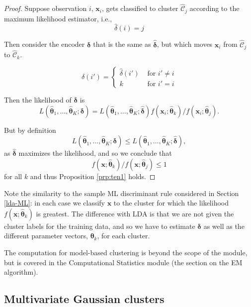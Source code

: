 \documentclass[
]{book}
\theoremstyle{definition}
\theoremstyle{definition}
\theoremstyle{definition}
\theoremstyle{definition}
\theoremstyle{remark}
\begin{document}
\begin{proof}
Suppose observation \(i\), \(\mathbf x_i\), gets classified to cluster \(\hat{\mathcal{C}}_j\) according to the maximum likelihood estimator, i.e.,
\[\hat{\delta}(i)=j\]

Then consider the encoder \(\boldsymbol \delta\) that is the same as \(\hat{\boldsymbol \delta}\), but which moves \(\mathbf x_i\) from \(\hat{\mathcal{C}}_j\) to \(\hat{\mathcal{C}}_k\).

\[\delta(i') =\begin{cases}
\hat{\delta}(i') &\mbox{ for } i' \not = i\\
 k & \mbox{ for } i' = i
\end{cases}\]

Then the likelihood of \(\boldsymbol \delta\) is
\[
L(\hat{\boldsymbol \theta}_1, \ldots , \hat{\boldsymbol \theta}_K; \boldsymbol \delta) = L(\hat{\boldsymbol \theta}_1, \ldots , \hat{\boldsymbol \theta}_K; \hat{\boldsymbol \delta})f(\mathbf x_i; \hat{\boldsymbol \theta}_k)/f(\mathbf x_i; \hat{\boldsymbol \theta}_j).
\]

But by definition
\[
L(\hat{\boldsymbol \theta}_1, \ldots , \hat{\boldsymbol \theta}_K; \boldsymbol \delta) \leq L(\hat{\boldsymbol \theta}_1, \ldots , \hat{\boldsymbol \theta}_K; \hat{\boldsymbol \delta}),
\]
as \(\hat{\boldsymbol \delta}\) maximizes the likelihood, and so we conclude that
\[f(\mathbf x; \hat{\boldsymbol \theta}_k)/f(\mathbf x; \hat{\boldsymbol \theta}_j)\leq1\]
for all \(k\)
and thus Proposition \ref{prp:ten1} holds.
\end{proof}

Note the similarity to the sample ML discriminant rule considered in Section \ref{lda-ML}: in each case we classify \(\mathbf x\) to the cluster for which the likelihood \(f(\mathbf x; \hat{\boldsymbol \theta}_k)\) is greatest. The difference with LDA is that we are not given the cluster labels for the training data, and so we have to estimate \(\boldsymbol \delta\) as well as the different parameter vectors, \(\boldsymbol \theta_k\), for each cluster.

The computation for model-based clustering is beyond the scope of the module, but is covered in the Computational Statistics module (the section on the EM algorithm).

\subsection{Multivariate Gaussian clusters}\label{multivariate-gaussian-clusters}
\end{document}

